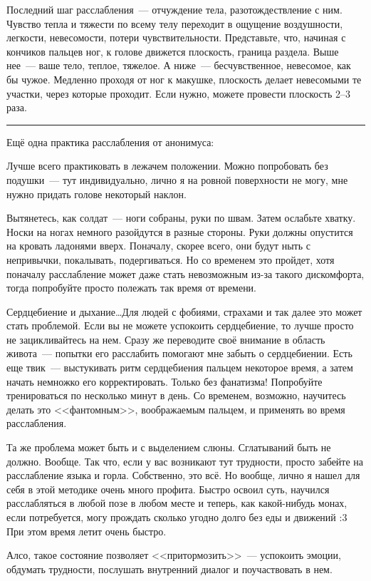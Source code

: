 \documentclass[a5paper,12pt,twoside]{memoir}
\begin{document}
Последний шаг расслабления~--- отчуждение тела, разотождествление с ним. Чувство тепла и тяжести по всему телу переходит в ощущение воздушности, легкости, невесомости, потери чувствительности. Представьте, что, начиная с кончиков пальцев ног, к голове движется плоскость, граница раздела. Выше нее~--- ваше тело, теплое, тяжелое. А ниже~--- бесчувственное, невесомое, как бы чужое. Медленно проходя от ног к макушке, плоскость делает невесомыми те участки, через которые проходит. Если нужно, можете провести плоскость 2--3 раза.

\newpage
\fancybreak{* * *}

Ещё одна практика расслабления от анонимуса:

Лучше всего практиковать в лежачем положении. Можно попробовать без подушки~--- тут индивидуально, лично я на ровной поверхности не могу, мне нужно придать голове некоторый наклон.

Вытянетесь, как солдат~--- ноги собраны, руки по швам. Затем ослабьте хватку. Носки на ногах немного разойдутся в разные стороны. Руки должны опустится на кровать ладонями вверх. Поначалу, скорее всего, они будут ныть с непривычки, покалывать, подергиваться. Но со временем это пройдет, хотя поначалу расслабление может даже стать невозможным из-за такого дискомфорта, тогда попробуйте просто полежать так время от времени.

Сердцебиение и дыхание\ldots Для людей с фобиями, страхами и так далее  это может стать проблемой. Если вы не можете успокоить сердцебиение, то лучше просто не зацикливайтесь на нем. Сразу же переводите своё внимание в область живота~--- попытки его расслабить помогают мне забыть о сердцебиении. Есть еще твик~--- выстукивать ритм сердцебиения пальцем некоторое время, а затем начать немножко его корректировать. Только без фанатизма! Попробуйте тренироваться по несколько минут в день. Со временем, возможно, научитесь делать это <<фантомным>>, воображаемым пальцем, и применять во время расслабления.

Та же проблема может быть и с выделением слюны. Сглатываний быть не должно. Вообще. Так что, если у вас возникают тут трудности, просто забейте на расслабление языка и горла.
Собственно, это всё. Но вообще, лично я нашел для себя в этой методике очень много профита. Быстро освоил суть, научился расслабляться в любой позе в любом месте и теперь, как какой-нибудь монах, если потребуется, могу прождать сколько угодно долго без еды и движений :3 При этом время летит очень быстро. 

Алсо, такое состояние позволяет <<притормозить>>~--- успокоить эмоции, обдумать трудности, послушать внутренний диалог и поучаствовать в нем.
\end{document}
